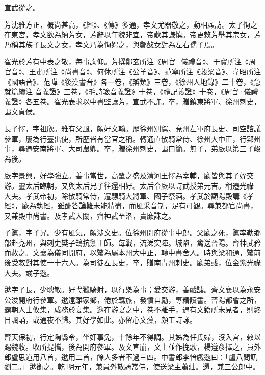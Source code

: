 \begin{pinyinscope}
 宣武從之。



 芳沈雅方正，概尚甚高，《經》、《傳》多通，孝文尤器敬之，動相顧訪。太子恂之在東宮，孝文欲為納芳女，芳辭以年貌非宜，帝歎其謙慎。帝更敕芳舉其宗女，芳乃稱其族子長文之女，孝文乃為恂娉之，與鄭懿女對為左右孺子焉。



 崔光於芳有中表之敬，每事詢仰。芳撰鄭玄所注《周官·儀禮音》、干寶所注《周官音》、王肅所注《尚書音》、何休所注《公羊音》、范寧所注《穀梁音》、韋昭所注《國語音》、范曄《後漢書音》各一卷，《辯類》三卷，《徐州人地錄》二十卷，《急就篇續注
 音義證》三卷，《毛詩箋音義證》十卷，《禮記義證》十卷，《周官·儀禮義證》各五卷。崔光表求以中書監讓芳，宣武不許。卒，贈鎮東將軍、徐州刺史，謚文貞侯。



 長子懌，字祖欣。雅有父風，頗好文翰。歷徐州別駕、兗州左軍府長史、司空諮議參軍，屢為行臺出使，所歷皆有當官之稱。轉通直散騎常侍、徐州大中正，行郢州事，尋遷安南將軍、大司農卿。卒，贈徐州刺史，謚曰簡。無子，弟廞以第三子峻為後。



 廞字景興，好學強立。善事當世，高肇之盛及清河王懌為宰輔，廞皆與其子姪交游。靈太后臨朝，又與太后兄子往還相好。太后令廞以詩武授弟元吉。稍遷光祿
 大夫。孝武帝初，除散騎常侍，遷驃騎大將軍、國子祭酒。孝武於顯陽殿講《孝經》，廞為執經，雖酬答論難未能精盡，而風采音制，足有可觀。尋兼都官尚書，又兼殿中尚書。及孝武入關，齊神武至洛，責廞誅之。



 子騭，字子昇。少有風氣，頗涉文史。位徐州開府從事中郎。父廞之死，騭率勒鄉部赴兗州，與刺史樊子鵠抗禦王師。每戰，流涕突陣。城陷，禽送晉陽。齊神武矜而赦之。文襄為儀同開府，以騭為屬本州大中正，轉中書舍人。時與梁和通，騭前後受敕對其使一十六人。為司徒左長史，卒，贈南青州刺史。廞弟彧，位金紫光祿大夫。彧子逖。



 逖字子長，少聰敏。好弋獵騎射，以行樂為事；愛交游，善戲謔。齊文襄以為永安公浚開府行參軍。逖遠離家鄉，倦於羈旅，發憤自勵，專精讀書。晉陽都會之所，霸朝人士攸集，咸務於宴集。逖在游宴之中，卷不離手，遇有文籍所未見者，則終日諷誦，或通夜不歸。其好學如此。亦留心文藻，頗工詩詠。



 齊天保初，行定陶縣令，坐奸事免，十餘年不得調。其姊為任氏婦，沒入宮，敕以賜魏收。收所提攜，後為開府參軍。及文宣崩，文士並作挽歌，楊遵彥擇之，員外郎盧思道用八首，逖用二首，餘人多者不過三四。中書郎李愔戲逖曰：「盧八問訊劉二。」逖銜之。乾
 明元年，兼員外散騎常侍，使送梁主蕭莊。還，兼三公郎中。




\end{pinyinscope}

